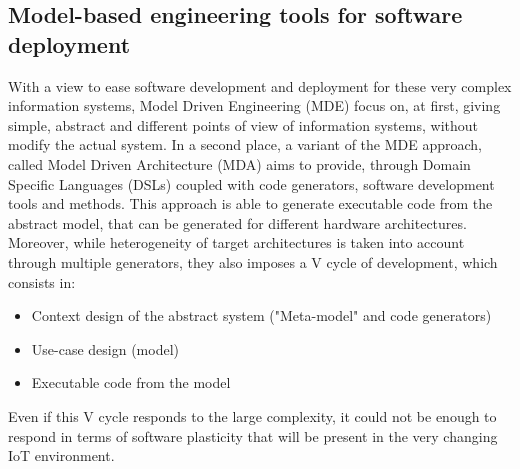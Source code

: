 


\subsection{Model-based engineering tools for software deployment}
With a view to ease software development and deployment for these very complex information systems, Model Driven Engineering (MDE) focus on, at first, giving simple, abstract and different points of view of information systems, without modify the actual system. 
In a second place, a variant of the MDE approach, called Model Driven Architecture (MDA)\cite{kleppe2003mda} aims to provide, through Domain Specific Languages (DSLs) coupled with code generators, software development tools and methods.
This approach is able to generate executable code from the abstract model, that can be generated for different hardware architectures.
Moreover, while heterogeneity of target architectures is taken into account through multiple generators, they also imposes a V cycle of development\cite{fouquet2013kevoree}, which consists in:
\begin{itemize}
	\item Context design of the abstract system ("Meta-model" and code generators)
	\item Use-case design (model)
	\item Executable code from the model
\end{itemize}
Even if this V cycle responds to the large complexity, it could not be enough to respond in terms of software plasticity that will be present in the very changing IoT environment.

